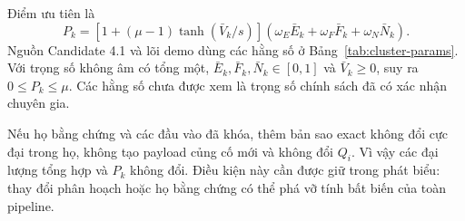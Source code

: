 Điểm ưu tiên là
\begin{equation}
 P_k=\left[1+(\mu-1)\tanh(\bar V_k/s)\right]
       (\omega_E\bar E_k+\omega_F\bar F_k+\omega_N\bar N_k).
 \label{eq:priority-report}
\end{equation}
Nguồn Candidate 4.1 và lõi demo dùng các hằng số ở Bảng~\ref{tab:cluster-params}. Với trọng số không âm có tổng một, $\bar E_k,\bar F_k,\bar N_k\in[0,1]$ và $\bar V_k\geq0$, suy ra $0\leq P_k\leq\mu$. Các hằng số chưa được xem là trọng số chính sách đã có xác nhận chuyên gia.

Nếu họ bằng chứng và các đầu vào đã khóa, thêm bản sao exact không đổi cực đại trong họ, không tạo payload củng cố mới và không đổi $Q_i$. Vì vậy các đại lượng tổng hợp và $P_k$ không đổi. Điều kiện này cần được giữ trong phát biểu: thay đổi phân hoạch hoặc họ bằng chứng có thể phá vỡ tính bất biến của toàn pipeline.
